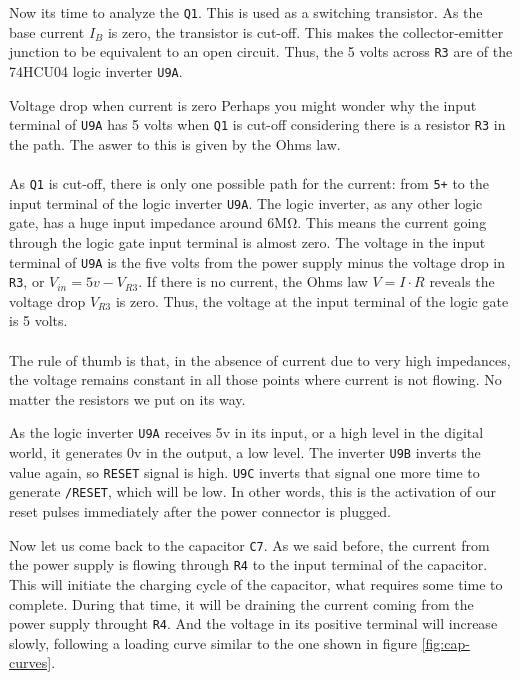 Now its time to analyze the  {\tt Q1}. This is used as a switching transistor. As the base current $I_B$ is zero, the transistor is cut-off. This makes the collector-emitter junction to be equivalent to an open circuit. Thus, the 5 volts across {\tt R3} are  of the 74HCU04 logic inverter {\tt U9A}.

\begin{theory}[htbp]{Voltage drop when current is zero}
  Perhaps you might wonder why the input terminal of {\tt U9A} has 5 volts when {\tt Q1} is cut-off considering there is a resistor {\tt R3} in the path. The aswer to this is given by the Ohms law.\\\\

  As {\tt Q1} is cut-off, there is only one possible path for the current: from {\tt 5+} to the input terminal of the logic inverter {\tt U9A}. The logic inverter, as any other logic gate, has a huge input impedance around 6M\si{\ohm}. This means the current going through the logic gate input terminal is almost zero. The voltage in the input terminal of {\tt U9A} is the five volts from the power supply minus the voltage drop in {\tt R3}, or $V_{in} = 5v - V_{R3}$. If there is no current, the Ohms law $V=I \cdot R$ reveals the voltage drop $V_{R3}$ is zero. Thus, the voltage at the input terminal of the logic gate is 5 volts.\\\\

  The rule of thumb is that, in the absence of current due to very high impedances, the voltage remains constant in all those points where current is not flowing. No matter the resistors we put on its way.
\end{theory}

As the logic inverter {\tt U9A} receives 5v in its input, or a high level in the digital world, it generates 0v in the output, a low level. The inverter {\tt U9B} inverts the value again, so {\tt RESET} signal is high. {\tt U9C} inverts that signal one more time to generate {\tt /RESET}, which will be low. In other words, this is the activation of our reset pulses immediately after the power connector is plugged.

Now let us come back to the capacitor {\tt C7}. As we said before, the current from the power supply is flowing through {\tt R4} to the input terminal of the capacitor. This will initiate the charging cycle of the capacitor, what requires some time to complete. During that time, it will be draining the current coming from the power supply throught {\tt R4}. And the voltage in its positive terminal will increase slowly, following a loading curve similar to the one shown in figure \ref{fig:cap-curves}.

